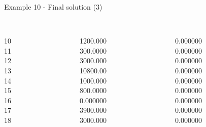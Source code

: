 \begin{frame}{Example 10 - Final solution (3)}
\footnotesize

\begin{columns}[t]
\begin{column}{0.3\textwidth}
\\
10\\
11\\
12\\
13\\
14\\
15\\
16\\
17\\
18\\

\end{column}
\begin{column}{0.3\textwidth}
\\
1200.000\\
300.0000\\
3000.000\\
10800.00\\
1000.000\\
800.0000\\
0.000000\\
3900.000\\
3000.000\\

\end{column}

\begin{column}{0.3\textwidth}
\\
0.000000\\
0.000000\\
0.000000\\
0.000000\\
0.000000\\
0.000000\\
0.000000\\
0.000000\\
0.000000\\

\end{column}
\end{columns}
\end{frame}
